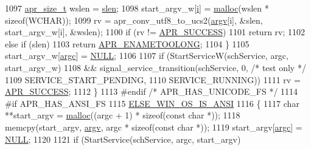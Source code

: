\begin{DoxyCode}
{{{1097             \hyperlink{group__apr__platform_gaaa72b2253f6f3032cefea5712a27540e}{apr\_size\_t} wslen = \hyperlink{group__APR__Util__Escaping_ga00eba03f583932b8cdcec6e0847f08b3}{slen};
1098             start\_argv\_w[\hyperlink{group__MOD__PROXY_ga38403a0592eb8018a3ad61aef0f7ca2c}{i}] = \hyperlink{util__expr__parse_8c_a5faf6a2d99f50a4655dd390199a8db7b}{malloc}(wslen * \textcolor{keyword}{sizeof}(WCHAR));
1099             rv = apr\_conv\_utf8\_to\_ucs2(\hyperlink{group__APACHE__CORE__LISTEN_ga7af4ef3a08f923773e59081c357d9adf}{argv}[i], &slen, start\_argv\_w[i], &wslen);
1100             \textcolor{keywordflow}{if} (rv != \hyperlink{group__apr__errno_ga9ee311b7bf1c691dc521d721339ee2a6}{APR\_SUCCESS})
1101                 \textcolor{keywordflow}{return} rv;
1102             \textcolor{keywordflow}{else} \textcolor{keywordflow}{if} (slen)
1103                 \textcolor{keywordflow}{return} \hyperlink{group__APR__Error_ga3db63b16c2b332efe441e2661f593377}{APR\_ENAMETOOLONG};
1104         \}
1105         start\_argv\_w[\hyperlink{group__APACHE__CORE__LISTEN_ga073cc653debb351b563a84ac72c49614}{argc}] = \hyperlink{pcre_8txt_ad7f989d16aa8ca809a36bc392c07fba1}{NULL};
1106 
1107         \textcolor{keywordflow}{if} (StartServiceW(schService, argc, start\_argv\_w)
1108             && signal\_service\_transition(schService, 0, \textcolor{comment}{/* test only */}
1109                                          SERVICE\_START\_PENDING,
1110                                          SERVICE\_RUNNING))
1111                 rv = \hyperlink{group__apr__errno_ga9ee311b7bf1c691dc521d721339ee2a6}{APR\_SUCCESS};
1112     \}
1113 \textcolor{preprocessor}{#endif }\textcolor{comment}{/* APR\_HAS\_UNICODE\_FS */}\textcolor{preprocessor}{}
1114 \textcolor{preprocessor}{#if APR\_HAS\_ANSI\_FS}
1115     \hyperlink{win32_2apr__arch__misc_8h_a2d1423da7a6a46da1276017c8140be22}{ELSE\_WIN\_OS\_IS\_ANSI}
1116     \{
1117         \textcolor{keywordtype}{char} **start\_argv = \hyperlink{util__expr__parse_8c_a5faf6a2d99f50a4655dd390199a8db7b}{malloc}((argc + 1) * \textcolor{keyword}{sizeof}(\textcolor{keyword}{const} \textcolor{keywordtype}{char} *));
1118         memcpy(start\_argv, \hyperlink{group__APACHE__CORE__LISTEN_ga7af4ef3a08f923773e59081c357d9adf}{argv}, argc * \textcolor{keyword}{sizeof}(\textcolor{keyword}{const} \textcolor{keywordtype}{char} *));
1119         start\_argv[\hyperlink{group__APACHE__CORE__LISTEN_ga073cc653debb351b563a84ac72c49614}{argc}] = \hyperlink{pcre_8txt_ad7f989d16aa8ca809a36bc392c07fba1}{NULL};
1120 
1121         \textcolor{keywordflow}{if} (StartService(schService, argc, start\_argv)
}}}
\end{DoxyCode}
